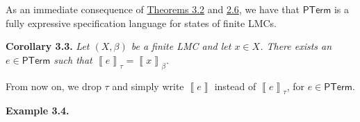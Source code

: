 \documentclass[11pt,a4paper]{amsart}
\begin{document}
\par\medskip
\hypertarget{html:S3.SS0.SSS0.Px1.p5}{} As an immediate consequence of \hyperlink{html:S3.Thmtheorem2}{Theorems 3.2} and \hyperlink{html:S2.Thmtheorem6}{2.6}, we have that %
\hypertarget{html:S3.SS0.SSS0.Px1.p5.m1}{}\({\mathsf{PTerm}}\) is a fully expressive specification language for states of finite LMCs.
\par\medskip
\hypertarget{html:S3.Thmtheorem3}{} \par\noindent\textbf{\textbf{Corollary 3.3}\textbf{.}}\quad  %
\hypertarget{html:S3.Thmtheorem3.p1}{} \emph{Let %
\hypertarget{html:S3.Thmtheorem3.p1.m1}{}\({(X,\beta)}\) be a finite LMC and let %
\hypertarget{html:S3.Thmtheorem3.p1.m2}{}\({x\in X}\). There exists an %
\hypertarget{html:S3.Thmtheorem3.p1.m3}{}\({e\in\mathsf{PTerm}}\) such that %
\hypertarget{html:S3.Thmtheorem3.p1.m4}{}\({\left\llbracket{e}\right\rrbracket_{\tau}=\left\llbracket{x}\right\rrbracket_{\beta}}\).}
\par\medskip
\hypertarget{html:S3.SS0.SSS0.Px1.p6}{} From now on, we drop %
\hypertarget{html:S3.SS0.SSS0.Px1.p6.m1}{}\({\tau}\) and simply write %
\hypertarget{html:S3.SS0.SSS0.Px1.p6.m2}{}\({\left\llbracket{e}\right\rrbracket}\) instead of %
\hypertarget{html:S3.SS0.SSS0.Px1.p6.m3}{}\({\left\llbracket{e}\right\rrbracket_{\tau}}\), for %
\hypertarget{html:S3.SS0.SSS0.Px1.p6.m4}{}\({e\in\mathsf{PTerm}}\).
\par\medskip
\hypertarget{html:S3.Thmtheorem4}{} \par\noindent\textbf{\textbf{Example 3.4}\textbf{.}}\quad  %
\end{document}
